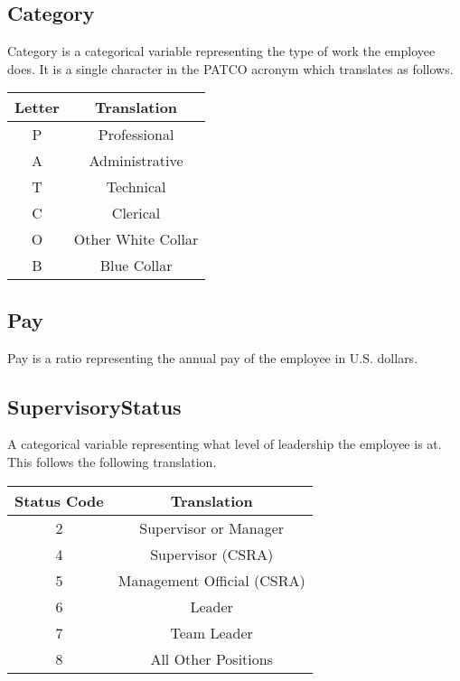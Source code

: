 \documentclass{article}
\begin{document}
    \subsection{Category}
    Category is a categorical variable representing the type of work the employee does. It is a single character in the PATCO acronym which translates as follows.

        \begin{center}
            \begin{tabular}{ |c|c| }
                \hline
                Letter & Translation \\
                \hline
                P & Professional \\
                A & Administrative \\
                T & Technical \\
                C & Clerical \\
                O & Other White Collar \\
                B & Blue Collar \\
                \hline
            \end{tabular}
        \end{center}

    \subsection{Pay}
    Pay is a ratio representing the annual pay of the employee in U.S. dollars.

    \subsection{SupervisoryStatus}
    A categorical variable representing what level of leadership the employee is at. This follows the following translation.

        \begin{center}
            \begin{tabular}{ |c|c| }
                \hline
                Status Code & Translation \\
                \hline
                2 & Supervisor or Manager \\
                4 & Supervisor (CSRA) \\
                5 & Management Official (CSRA) \\
                6 & Leader \\
                7 & Team Leader \\
                8 & All Other Positions \\
                \hline
            \end{tabular}
        \end{center}
\end{document}

